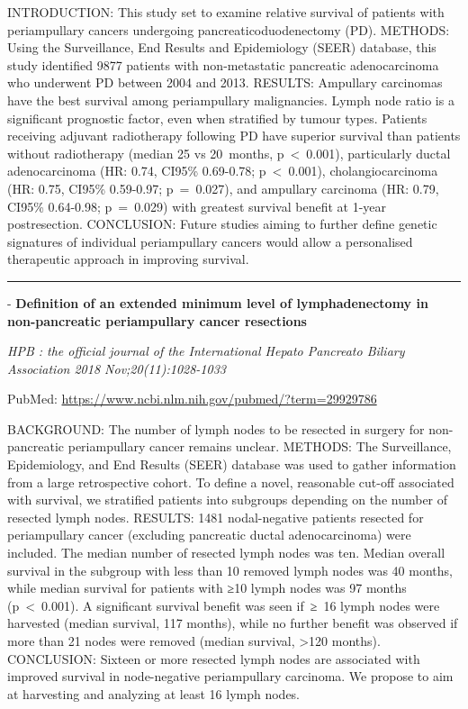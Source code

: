 \documentclass[]{article}
\begin{document}
INTRODUCTION: This study set to examine relative survival of patients
with periampullary cancers undergoing pancreaticoduodenectomy (PD).
METHODS: Using the Surveillance, End Results and Epidemiology (SEER)
database, this study identified 9877 patients with non-metastatic
pancreatic adenocarcinoma who underwent PD between 2004 and 2013.
RESULTS: Ampullary carcinomas have the best survival among periampullary
malignancies. Lymph node ratio is a significant prognostic factor, even
when stratified by tumour types. Patients receiving adjuvant
radiotherapy following PD have superior survival than patients without
radiotherapy (median 25 vs 20~months, p~\textless{}~0.001), particularly
ductal adenocarcinoma (HR: 0.74, CI95\% 0.69-0.78; p~\textless{}~0.001),
cholangiocarcinoma (HR: 0.75, CI95\% 0.59-0.97; p~=~0.027), and
ampullary carcinoma (HR: 0.79, CI95\% 0.64-0.98; p~=~0.029) with
greatest survival benefit at 1-year postresection. CONCLUSION: Future
studies aiming to further define genetic signatures of individual
periampullary cancers would allow a personalised therapeutic approach in
improving survival.

{}

{}

\begin{center}\rule{0.5\linewidth}{\linethickness}\end{center}

 - \textbf{Definition of an extended minimum level of lymphadenectomy in
non-pancreatic periampullary cancer resections}

\emph{HPB : the official journal of the International Hepato Pancreato
Biliary Association 2018 Nov;20(11):1028-1033}

PubMed: \url{https://www.ncbi.nlm.nih.gov/pubmed/?term=29929786}

BACKGROUND: The number of lymph nodes to be resected in surgery for
non-pancreatic periampullary cancer remains unclear. METHODS: The
Surveillance, Epidemiology, and End Results (SEER) database was used to
gather information from a large retrospective cohort. To define a novel,
reasonable cut-off associated with survival, we stratified patients into
subgroups depending on the number of resected lymph nodes. RESULTS: 1481
nodal-negative patients resected for periampullary cancer (excluding
pancreatic ductal adenocarcinoma) were included. The median number of
resected lymph nodes was ten. Median overall survival in the subgroup
with less than 10 removed lymph nodes was 40 months, while median
survival for patients with ≥10 lymph nodes was 97 months
(p~\textless{}~0.001). A significant survival benefit was seen if~≥~16
lymph nodes were harvested (median survival, 117 months), while no
further benefit was observed if more than 21 nodes were removed (median
survival, \textgreater{}120 months). CONCLUSION: Sixteen or more
resected lymph nodes are associated with improved survival in
node-negative periampullary carcinoma. We propose to aim at harvesting
and analyzing at least 16 lymph nodes.
\end{document}

